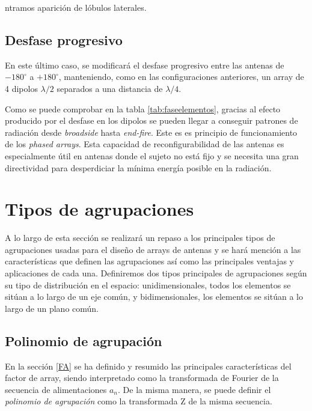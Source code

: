 ntramos aparición de lóbulos laterales. \cite{Valero2008}






\subsection{Desfase progresivo}
\label{desfasprog}
\par En este último caso, se modificará el desfase progresivo entre las antenas de $-180^{\circ}$ a $+180^{\circ}$, manteniendo, como en las configuraciones anteriores, un array de 4 dipolos $\lambda/2$ separados a una distancia de $\lambda/4$. \cite{Valero2008}
\\
\par Como se puede comprobar en la tabla \ref{tab:faseelementos}, gracias al efecto producido por el desfase en los dipolos se pueden llegar a conseguir patrones de radiación desde \textit{broadside} hasta \textit{end-fire}. Este es es principio de funcionamiento de los \textit{phased arrays}. Esta capacidad de reconfigurabilidad de las antenas es especialmente útil en antenas donde el sujeto no está fijo y se necesita una gran directividad para desperdiciar la mínima energía posible en la radiación.



\section{Tipos de agrupaciones}
\par A lo largo de esta sección se realizará un repaso a los principales tipos de agrupaciones usadas para el diseño de arrays de antenas y se hará mención a las características que definen las agrupaciones así como las principales ventajas y aplicaciones de cada una. Definiremos dos tipos principales de agrupaciones según su tipo de distribución en el espacio: unidimensionales, todos los elementos se sitúan a lo largo de un eje común, y bidimensionales, los elementos se sitúan a lo largo de un plano común.

\subsection{Polinomio de agrupación}
\par En la sección \ref{FA} se ha definido y resumido las principales características del factor de array, siendo interpretado como la transformada de Fourier de la secuencia de alimentaciones $a_{n}$. De la misma manera, se puede definir el \textit{polinomio de agrupación} como la transformada Z de la misma secuencia. \cite{Cardama2002}

